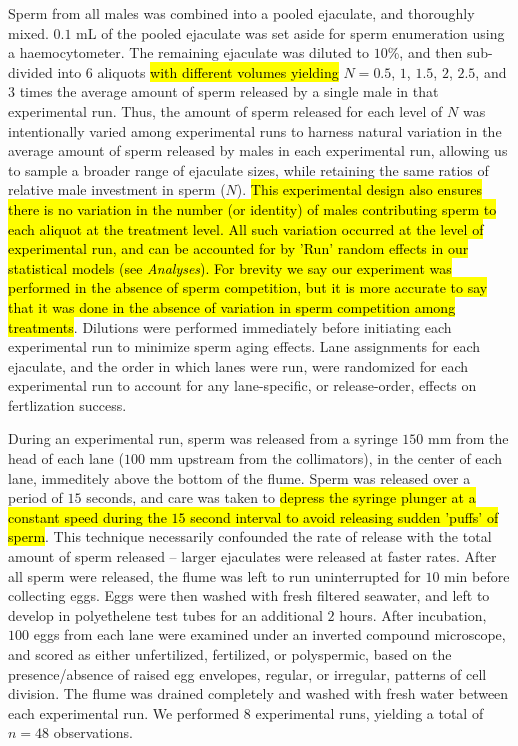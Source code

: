 \documentclass{article}
\begin{document}
	Sperm from all males was combined into a pooled ejaculate, and thoroughly mixed. $0.1$ mL of the pooled ejaculate was set aside for sperm enumeration using a haemocytometer. The remaining ejaculate was diluted to $10$\%, and then sub-divided into $6$ aliquots \hl{with different volumes yielding} $N = 0.5$, $1$, $1.5$, $2$, $2.5$, and $3$ times the average amount of sperm released by a single male in that experimental run. Thus, the amount of sperm released for each level of $N$ was intentionally varied among experimental runs to harness natural variation in the average amount of sperm released by males in each experimental run, allowing us to sample a broader range of ejaculate sizes, while retaining the same ratios of relative male investment in sperm ($N$). \hl{This experimental design also ensures there is no variation in the number (or identity) of males contributing sperm to each aliquot at the treatment level. All such variation occurred at the level of experimental run, and can be accounted for by 'Run' random effects in our statistical models (see \textit{Analyses}). For brevity we say our experiment was performed in the absence of sperm competition, but it is more accurate to say that it was done in the absence of variation in sperm competition among treatments}. Dilutions were performed immediately before initiating each experimental run to minimize sperm aging effects. Lane assignments for each ejaculate, and the order in which lanes were run, were randomized for each experimental run to account for any lane-specific, or release-order, effects on fertlization success.

	During an experimental run, sperm was released from a syringe $150$ mm from the head of each lane ($100$ mm upstream from the collimators), in the center of each lane, immeditely above the bottom of the flume. Sperm was released over a period of $15$ seconds, and care was taken to \hl{depress the syringe plunger at a constant speed during the $15$ second interval to avoid releasing sudden 'puffs' of sperm}. This technique necessarily confounded the rate of release with the total amount of sperm released -- larger ejaculates were released at faster rates. After all sperm were released, the flume was left to run uninterrupted for $10$ min before collecting eggs. Eggs were then washed with fresh filtered seawater, and left to develop in polyethelene test tubes for an additional $2$ hours. After incubation, $100$ eggs from each lane were examined under an inverted compound microscope, and scored as either unfertilized, fertilized, or polyspermic, based on the presence/absence of raised egg envelopes, regular, or irregular, patterns of cell division. The flume was drained completely and washed with fresh water between each experimental run. We performed $8$ experimental runs, yielding a total of $n=48$ observations.
\end{document}
